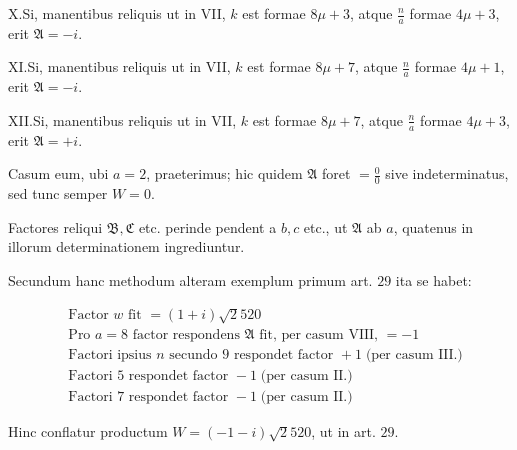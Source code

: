 %
X.\quad Si, manentibus reliquis ut in VII, $k$ est formae $8\mu+3$, atque $\frac{n}{a}$ formae $4\mu+3$, erit $\mathfrak A=-i$.

XI.\quad Si, manentibus reliquis ut in VII, $k$ est formae $8\mu+7$, atque $\frac{n}{a}$ formae $4\mu+1$, erit $\mathfrak A=-i$.

XII.\quad Si, manentibus reliquis ut in VII, $k$ est formae $8\mu+7$, atque $\frac{n}{a}$ formae $4\mu+3$, erit $\mathfrak A=+i$.

Casum eum, ubi $a=2$, praeterimus; hic quidem $\mathfrak A$ foret $=\frac00$ sive indeterminatus, sed tunc semper $W=0$.

Factores reliqui $\mathfrak B,\mathfrak C$ etc. perinde pendent a $b,c$ etc., ut $\mathfrak A$ ab $a$, quatenus in illorum determinationem ingrediuntur.


Secundum hanc methodum alteram exemplum primum art. $29$ ita se habet:

{\small
\[
\begin{aligned}
&\text{Factor }w\text{ fit }=(1+i)\surd2520\\
&\text{Pro }a=8\text{ factor respondens }\mathfrak A\text{ fit, per casum VIII, }=-1\\
&\text{Factori ipsius }n\text{ secundo }9\text{ respondet factor }+1\;\text{(per casum III.)}\\
&\text{Factori }5\text{ respondet factor }-1\;\text{(per casum II.)}\\
&\text{Factori }7\text{ respondet factor }-1\;\text{(per casum II.)}
\end{aligned}
\]
}

Hinc conflatur productum $W=(-1-i)\surd2520$, ut in art. $29$.


